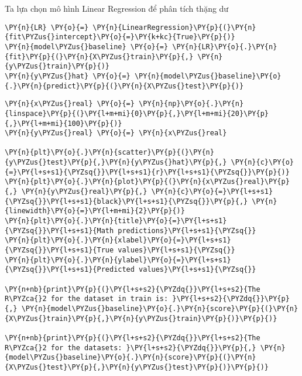     Ta lựa chọn mô hình Linear Regression để phân tích thặng dư

    \begin{tcolorbox}[breakable, size=fbox, boxrule=1pt, pad at break*=1mm,colback=cellbackground, colframe=cellborder]
\begin{Verbatim}[commandchars=\\\{\}]
\PY{n}{LR} \PY{o}{=} \PY{n}{LinearRegression}\PY{p}{(}\PY{n}{fit\PYZus{}intercept}\PY{o}{=}\PY{k+kc}{True}\PY{p}{)}
\PY{n}{model\PYZus{}baseline} \PY{o}{=} \PY{n}{LR}\PY{o}{.}\PY{n}{fit}\PY{p}{(}\PY{n}{X\PYZus{}train}\PY{p}{,} \PY{n}{y\PYZus{}train}\PY{p}{)}
\PY{n}{y\PYZus{}hat} \PY{o}{=} \PY{n}{model\PYZus{}baseline}\PY{o}{.}\PY{n}{predict}\PY{p}{(}\PY{n}{X\PYZus{}test}\PY{p}{)}
\end{Verbatim}
\end{tcolorbox}

    \begin{tcolorbox}[breakable, size=fbox, boxrule=1pt, pad at break*=1mm,colback=cellbackground, colframe=cellborder]
\begin{Verbatim}[commandchars=\\\{\}]
\PY{n}{x\PYZus{}real} \PY{o}{=} \PY{n}{np}\PY{o}{.}\PY{n}{linspace}\PY{p}{(}\PY{l+m+mi}{0}\PY{p}{,}\PY{l+m+mi}{20}\PY{p}{,}\PY{l+m+mi}{100}\PY{p}{)}
\PY{n}{y\PYZus{}real} \PY{o}{=} \PY{n}{x\PYZus{}real}

\PY{n}{plt}\PY{o}{.}\PY{n}{scatter}\PY{p}{(}\PY{n}{y\PYZus{}test}\PY{p}{,}\PY{n}{y\PYZus{}hat}\PY{p}{,} \PY{n}{c}\PY{o}{=}\PY{l+s+s1}{\PYZsq{}}\PY{l+s+s1}{r}\PY{l+s+s1}{\PYZsq{}}\PY{p}{)}
\PY{n}{plt}\PY{o}{.}\PY{n}{plot}\PY{p}{(}\PY{n}{x\PYZus{}real}\PY{p}{,} \PY{n}{y\PYZus{}real}\PY{p}{,} \PY{n}{c}\PY{o}{=}\PY{l+s+s1}{\PYZsq{}}\PY{l+s+s1}{black}\PY{l+s+s1}{\PYZsq{}}\PY{p}{,} \PY{n}{linewidth}\PY{o}{=}\PY{l+m+mi}{2}\PY{p}{)}
\PY{n}{plt}\PY{o}{.}\PY{n}{title}\PY{o}{=}\PY{l+s+s1}{\PYZsq{}}\PY{l+s+s1}{Math predictions}\PY{l+s+s1}{\PYZsq{}}
\PY{n}{plt}\PY{o}{.}\PY{n}{xlabel}\PY{o}{=}\PY{l+s+s1}{\PYZsq{}}\PY{l+s+s1}{True values}\PY{l+s+s1}{\PYZsq{}}
\PY{n}{plt}\PY{o}{.}\PY{n}{ylabel}\PY{o}{=}\PY{l+s+s1}{\PYZsq{}}\PY{l+s+s1}{Predicted values}\PY{l+s+s1}{\PYZsq{}}

\PY{n+nb}{print}\PY{p}{(}\PY{l+s+s2}{\PYZdq{}}\PY{l+s+s2}{The R\PYZca{}2 for the dataset in train is: }\PY{l+s+s2}{\PYZdq{}}\PY{p}{,} \PY{n}{model\PYZus{}baseline}\PY{o}{.}\PY{n}{score}\PY{p}{(}\PY{n}{X\PYZus{}train}\PY{p}{,}\PY{n}{y\PYZus{}train}\PY{p}{)}\PY{p}{)}

\PY{n+nb}{print}\PY{p}{(}\PY{l+s+s2}{\PYZdq{}}\PY{l+s+s2}{The R\PYZca{}2 for the datasets: }\PY{l+s+s2}{\PYZdq{}}\PY{p}{,} \PY{n}{model\PYZus{}baseline}\PY{o}{.}\PY{n}{score}\PY{p}{(}\PY{n}{X\PYZus{}test}\PY{p}{,}\PY{n}{y\PYZus{}test}\PY{p}{)}\PY{p}{)}
\end{Verbatim}
\end{tcolorbox}

